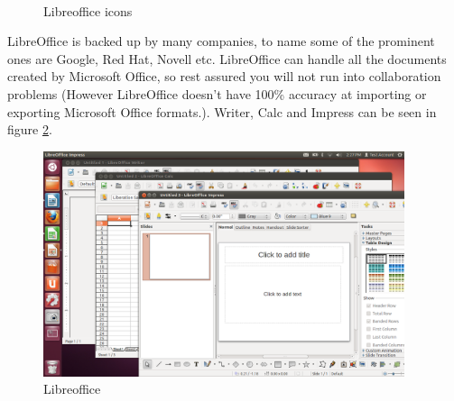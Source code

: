 \begin{figure}[ht!]	
		\centering		
		~ \hspace{0.5in}
		~ \hspace{0.5in}
		\caption{Libreoffice icons}
		\label{fig:office-icons}
\end{figure}

\par \noindent LibreOffice is backed up by many companies, to name some of the prominent ones are Google, Red Hat, Novell etc. LibreOffice can handle all the documents created by Microsoft Office, so rest assured you will not run into collaboration problems (However LibreOffice doesn't have 100\% accuracy at importing or exporting Microsoft Office formats.). Writer, Calc and Impress can be seen in figure \ref{fig:edit-office}.

\begin{figure}[h!]	
	\centering
	\includegraphics[width=300pt]{./images/basic-tasks/edit-office.png}
	\caption{Libreoffice}	
	\label{fig:edit-office}		
\end{figure}

